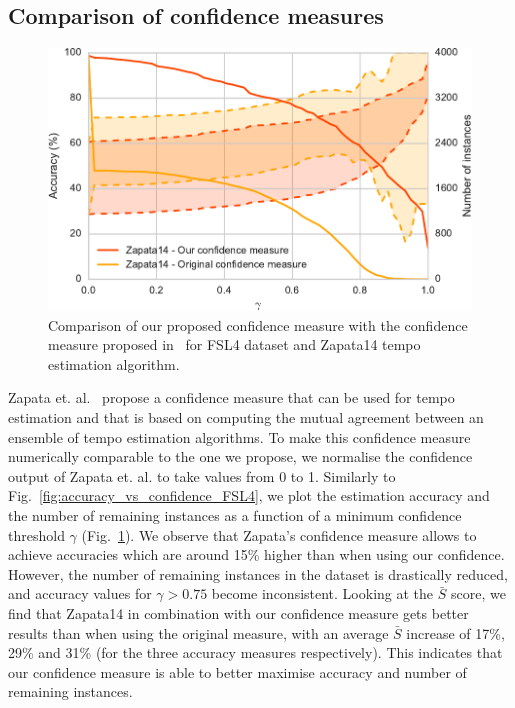 \documentclass{article}
\begin{document}
\subsection{Comparison of confidence measures}

\begin{figure}
 \centerline{
 \includegraphics[width=0.91\columnwidth]{figs/confidence_ffont_vs_confidence_zapata_FSL4-crop.pdf}}
 \caption{Comparison of our proposed confidence measure with the confidence measure proposed in~\cite{Zapata2012} for FSL4 dataset and Zapata14 tempo estimation algorithm.}
 \label{fig:confidence_vs_zapata_confidence_FSL4}
\end{figure}

Zapata et. al.~\cite{Zapata2012} propose a confidence measure that can be used for tempo estimation and that is based on computing the mutual agreement between an ensemble of tempo estimation algorithms. %
To make this confidence measure numerically comparable to the one we propose, we normalise the confidence output of Zapata et. al. to take values from 0 to 1.
Similarly to Fig.~\ref{fig:accuracy_vs_confidence_FSL4}, we plot the estimation accuracy and the number of remaining instances as a function of a minimum confidence threshold $\gamma$ (Fig.~\ref{fig:confidence_vs_zapata_confidence_FSL4}). 
We observe that Zapata's confidence measure allows to achieve accuracies which are around 15\% higher than when using our confidence. However, the number of remaining instances in the dataset is drastically reduced, and accuracy values for $\gamma > 0.75$ become inconsistent. 
Looking at the $\bar S$ score, we find that Zapata14 in combination with our confidence measure gets better results than when using the original measure, with an average $\bar S$ increase of 17\%, 29\% and 31\% (for the three accuracy measures respectively). 
This indicates that our confidence measure is able to better maximise accuracy and number of remaining instances.
\end{document}
